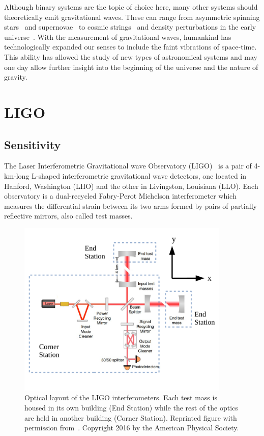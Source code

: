 \documentclass [12pt, proquest]{uwthesis}[2019]
\begin{document}
 Although binary systems are the topic of choice here, many other systems should theoretically emit gravitational waves. These can range from asymmetric spinning stars~\cite{contGW} and supernovae~\cite{SN} to cosmic strings~\cite{strings} and density perturbations in the early universe~\cite{inflation}. With the measurement of gravitational waves, humankind has technologically expanded our senses to include the faint vibrations of space-time. This ability has allowed the study of new types of astronomical systems and may one day allow further insight into the beginning of the universe and the nature of gravity.
\pagebreak
\section{LIGO}

\subsection{Sensitivity}

The Laser Interferometric Gravitational wave Observatory (LIGO)~\cite{aLIGO} is a pair of 4-km-long L-shaped interferometric gravitational wave detectors, one located in Hanford, Washington (LHO) and the other in Livingston, Louisiana (LLO). Each observatory is a dual-recycled Fabry-Perot Michelson interferometer which measures the differential strain between its two arms formed by pairs of partially reflective mirrors, also called test masses. 

\begin{figure}[!h]
\begin{center}
\includegraphics[width=0.9\textwidth]{LIGO_Layout.pdf}
\caption[Optical layout of the LIGO interferometers]{Optical layout of the LIGO interferometers. Each test mass is housed in its own building (End Station) while the rest of the optics are held in another building (Corner Station). Reprinted figure with permission from~\cite{LIGOSens}. Copyright 2016 by the American Physical Society.}
\label{LIGO_Schematic}
\end{center}
\end{figure}
\end{document}
